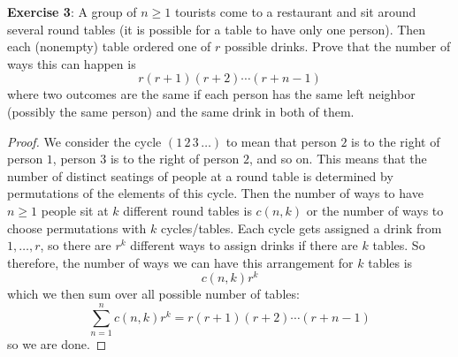 \documentclass{article}
\begin{document}
\textbf{Exercise 3}: A group of $n \geq 1$ tourists come to a restaurant and sit around several round tables (it is possible for a table to have only one person). Then each (nonempty) table ordered one of $r$ possible drinks. Prove that the number of ways this can happen is 
    \begin{equation*}
        r(r + 1)(r + 2)\cdots (r + n - 1)
    \end{equation*}
where two outcomes are the same if each person has the same left neighbor (possibly the same person) and the same drink in both of them.
        \begin{proof}
            We consider the cycle $(1 \, 2 \, 3 \, \ldots )$ to mean that person $2$ is to the right of person $1$, person $3$ is to the right of person $2$, and so on. This means that the number of distinct seatings of people at a round table is determined by permutations of the elements of this cycle. Then the number of ways to have $n \geq 1$ people sit at $k$ different round tables is $c(n, k)$ or the number of ways to choose permutations with $k$ cycles/tables. Each cycle gets assigned a drink from $1, \ldots , r$, so there are $r^{k}$ different ways to assign drinks if there are $k$ tables. So therefore, the number of ways we can have this arrangement for $k$ tables is 
                \begin{equation*}
                    c(n, k)r^{k}
                \end{equation*}
            which we then sum over all possible number of tables:
                \begin{equation*}
                    \sum_{n = 1}^{n} c(n, k)r^{k} = r(r + 1)(r + 2)\cdots (r + n - 1)
                \end{equation*}
            so we are done.
        \end{proof}
\end{document}
